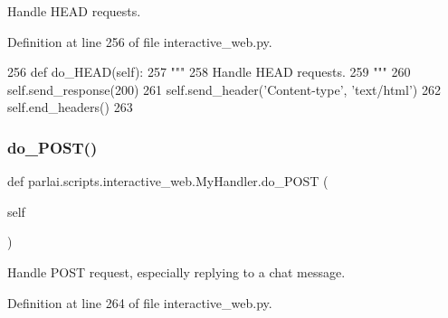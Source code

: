 \begin{DoxyVerb}Handle HEAD requests.
\end{DoxyVerb}
 

Definition at line 256 of file interactive\+\_\+web.\+py.


\begin{DoxyCode}
256     \textcolor{keyword}{def }do\_HEAD(self):
257         \textcolor{stringliteral}{"""}
258 \textcolor{stringliteral}{        Handle HEAD requests.}
259 \textcolor{stringliteral}{        """}
260         self.send\_response(200)
261         self.send\_header(\textcolor{stringliteral}{'Content-type'}, \textcolor{stringliteral}{'text/html'})
262         self.end\_headers()
263 
\end{DoxyCode}
\mbox{\label{classparlai_1_1scripts_1_1interactive__web_1_1MyHandler_abea6bbf8b4439489c05a388fa615506c}} 
\subsubsection{\texorpdfstring{do\+\_\+\+P\+O\+S\+T()}{do\_POST()}}
{\footnotesize\ttfamily def parlai.\+scripts.\+interactive\+\_\+web.\+My\+Handler.\+do\+\_\+\+P\+O\+ST (\begin{DoxyParamCaption}\item[{}]{self }\end{DoxyParamCaption})}

\begin{DoxyVerb}Handle POST request, especially replying to a chat message.
\end{DoxyVerb}
 

Definition at line 264 of file interactive\+\_\+web.\+py.



